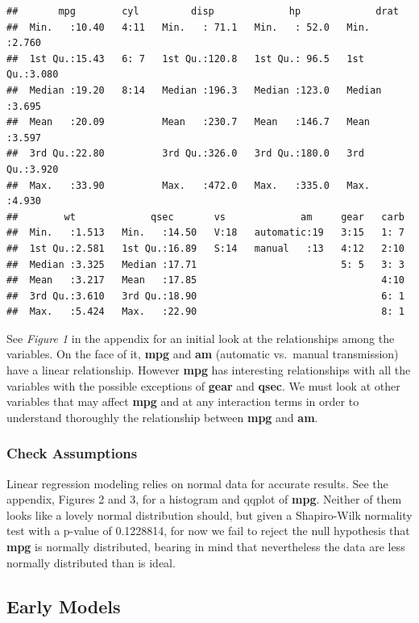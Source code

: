 \documentclass[]{article}
\begin{document}
\begin{verbatim}
##       mpg        cyl         disp             hp             drat      
##  Min.   :10.40   4:11   Min.   : 71.1   Min.   : 52.0   Min.   :2.760  
##  1st Qu.:15.43   6: 7   1st Qu.:120.8   1st Qu.: 96.5   1st Qu.:3.080  
##  Median :19.20   8:14   Median :196.3   Median :123.0   Median :3.695  
##  Mean   :20.09          Mean   :230.7   Mean   :146.7   Mean   :3.597  
##  3rd Qu.:22.80          3rd Qu.:326.0   3rd Qu.:180.0   3rd Qu.:3.920  
##  Max.   :33.90          Max.   :472.0   Max.   :335.0   Max.   :4.930  
##        wt             qsec       vs             am     gear   carb  
##  Min.   :1.513   Min.   :14.50   V:18   automatic:19   3:15   1: 7  
##  1st Qu.:2.581   1st Qu.:16.89   S:14   manual   :13   4:12   2:10  
##  Median :3.325   Median :17.71                         5: 5   3: 3  
##  Mean   :3.217   Mean   :17.85                                4:10  
##  3rd Qu.:3.610   3rd Qu.:18.90                                6: 1  
##  Max.   :5.424   Max.   :22.90                                8: 1
\end{verbatim}

See \emph{Figure 1} in the appendix for an initial look at the
relationships among the variables. On the face of it, \textbf{mpg} and
\textbf{am} (automatic vs.~manual transmission) have a linear
relationship. However \textbf{mpg} has interesting relationships with
all the variables with the possible exceptions of \textbf{gear} and
\textbf{qsec}. We must look at other variables that may affect
\textbf{mpg} and at any interaction terms in order to understand
thoroughly the relationship between \textbf{mpg} and \textbf{am}.

\subsubsection{Check Assumptions}\label{check-assumptions}

Linear regression modeling relies on normal data for accurate results.
See the appendix, Figures 2 and 3, for a histogram and qqplot of
\textbf{mpg}. Neither of them looks like a lovely normal distribution
should, but given a Shapiro-Wilk normality test with a p-value of
0.1228814, for now we fail to reject the null hypothesis that
\textbf{mpg} is normally distributed, bearing in mind that nevertheless
the data are less normally distributed than is ideal.

\subsection{Early Models}\label{early-models}
\end{document}
